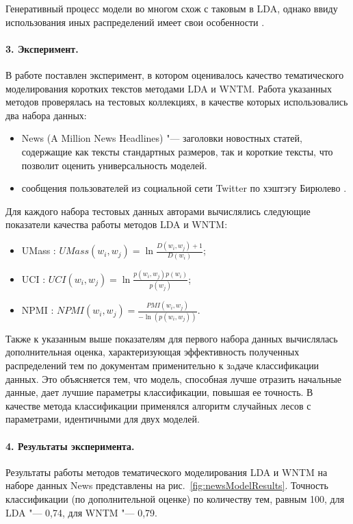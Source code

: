 Генеративный процесс модели во многом схож с таковым в LDA, однако ввиду использования иных распределений имеет свои особенности \cite{KeYuanJichang}. 

\paragraph{3. Эксперимент.} В работе поставлен эксперимент, в котором оценивалось качество тематического моделирования коротких текстов методами LDA и WNTM. Работа указанных методов проверялась на тестовых коллекциях, в качестве которых использовались
два набора данных:
\begin{itemize}
	\item News (A Million News Headlines) "--- заголовки новостных статей,
	содержащие как тексты стандартных размеров, так и короткие
	тексты, что позволит оценить универсальность моделей.
	\item сообщения пользователей из социальной сети Twitter по хэштэгу Бирюлево \cite{BodrunovaLitvinenkoBlekanov}.
\end{itemize}

Для каждого набора тестовых данных авторами вычислялись следующие показатели качества работы методов LDA и WNTM:
\begin{itemize}
	\item UMass \cite{MimnoWallachTalley}: \(\textit{UMass}(w_i, w_j) = \ln{\frac{D(w_i, w_j) + 1}{D(w_i)}}\);
	\item UCI \cite{NewmanLauGrieser}: \(\textit{UCI}(w_i, w_j) = \ln{\frac{p(w_i, w_j)p(w_i)}{p(w_j)}}\);
	\item NPMI \cite{StevesonAletras}: \(\textit{NPMI}(w_i, w_j) = \frac{\textit{PMI}(w_i, w_j)}{-\ln{(p(w_i, w_j))}}\).
\end{itemize}

Также к указанным выше показателям для первого набора данных вычислялась дополнительная оценка, характеризующая эффективность полученных распределений тем по документам применительно к зaдаче классификации данных. Это объясняется тем, что модель, способная лучше отразить начальные данные, дает лучшие параметры классификации, повышая ее точность. В качестве метода классификации применялся алгоритм случайных лесов с параметрами, идентичными для двух моделей. 

\paragraph{4. Результаты эксперимента.} Результаты работы методов тематического моделирования LDA и WNTM на наборе данных News представлены на рис.~\cref{fig:newsModelResults}. Точность классификации (по дополнительной оценке) по количеству тем, равным 100, для LDA "--- 0,74, для
WNTM "--- 0,79.

